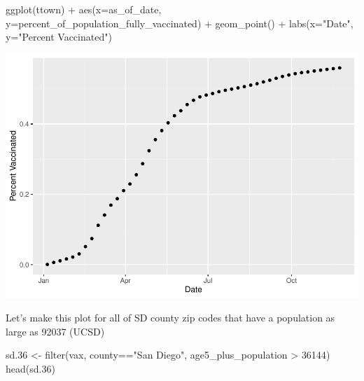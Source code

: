 \documentclass[
]{article}
\newenvironment{Shaded}{\begin{snugshade}}{\end{snugshade}}
\newcommand{\AttributeTok}[1]{\textcolor[rgb]{0.77,0.63,0.00}{#1}}
\newcommand{\DecValTok}[1]{\textcolor[rgb]{0.00,0.00,0.81}{#1}}
\newcommand{\FloatTok}[1]{\textcolor[rgb]{0.00,0.00,0.81}{#1}}
\newcommand{\FunctionTok}[1]{\textcolor[rgb]{0.00,0.00,0.00}{#1}}
\newcommand{\NormalTok}[1]{#1}
\newcommand{\OtherTok}[1]{\textcolor[rgb]{0.56,0.35,0.01}{#1}}
\newcommand{\SpecialCharTok}[1]{\textcolor[rgb]{0.00,0.00,0.00}{#1}}
\newcommand{\StringTok}[1]{\textcolor[rgb]{0.31,0.60,0.02}{#1}}
\begin{document}
\begin{Shaded}
\begin{Highlighting}[]
\FunctionTok{ggplot}\NormalTok{(ttown) }\SpecialCharTok{+} 
  \FunctionTok{aes}\NormalTok{(}\AttributeTok{x=}\NormalTok{as\_of\_date, }\AttributeTok{y=}\NormalTok{percent\_of\_population\_fully\_vaccinated) }\SpecialCharTok{+} 
  \FunctionTok{geom\_point}\NormalTok{() }\SpecialCharTok{+}
  \FunctionTok{labs}\NormalTok{(}\AttributeTok{x=}\StringTok{"Date"}\NormalTok{, }\AttributeTok{y=}\StringTok{"Percent Vaccinated"}\NormalTok{)}
\end{Highlighting}
\end{Shaded}

\includegraphics{Class17_Vax_files/figure-latex/unnamed-chunk-30-1.pdf}

Let's make this plot for all of SD county zip codes that have a
population as large as 92037 (UCSD)

\begin{Shaded}
\begin{Highlighting}[]
\NormalTok{sd}\FloatTok{.36} \OtherTok{\textless{}{-}} \FunctionTok{filter}\NormalTok{(vax, county}\SpecialCharTok{==}\StringTok{"San Diego"}\NormalTok{,}
\NormalTok{                age5\_plus\_population }\SpecialCharTok{\textgreater{}} \DecValTok{36144}\NormalTok{)}
\FunctionTok{head}\NormalTok{(sd}\FloatTok{.36}\NormalTok{)}
\end{Highlighting}
\end{Shaded}
\end{document}
